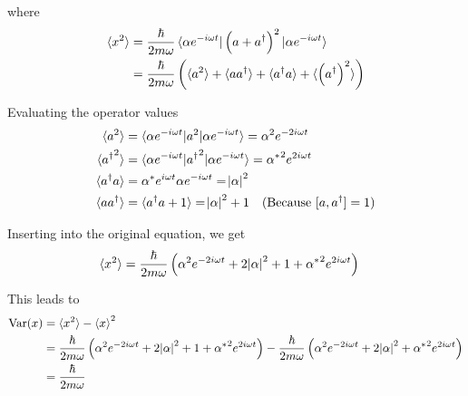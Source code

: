 \documentclass[a4paper,german,12pt,smallheadings]{scrartcl}
\begin{document}
\begin{enumerate}[a)]
    where
    \begin{align*}
      \braket{x^2} &= \frac{\hbar}{2 m \omega} \braket{\alpha e^{-i \omega t}|\del{a + a^\dagger}^2|\alpha e^{-i \omega t}} \\
                   &= \frac{\hbar}{2 m \omega} \del{\braket{a^2} + \braket{aa^\dagger} + \braket{a^\dagger a} + \braket{\del{a^\dagger}^2}}
    \end{align*}

    Evaluating the operator values
    \begin{align*}
      \braket{a^2} &= \braket{\alpha e^{-i \omega t}|a^2|\alpha e^{-i \omega t}} = \alpha^2 e^{-2i \omega t} \\
      \braket{{a^\dagger}^2} &= \braket{\alpha e^{-i \omega t}|{a^\dagger}^2|\alpha e^{-i \omega t}} = {\alpha^*}^2 e^{2i \omega t} \\
      \braket{a^\dagger a} &= \alpha^* e^{i \omega t} \alpha e^{-i \omega t} = \envert{\alpha}^2 \\
      \braket{aa^\dagger} &= \braket{a^\dagger a + 1} = \envert{\alpha}^2 + 1
      \quad \text{(Because $[a, a^\dagger] = 1$)} \\
    \end{align*}

    Inserting into the original equation, we get
    \begin{align*}
      \braket{x^2} &= \frac{\hbar}{2 m \omega} \del{\alpha^2 e^{-2i \omega t} + 2\envert{\alpha}^2 + 1 + {\alpha^*}^2 e^{2 i \omega t}}
    \end{align*}

    This leads to
    \begin{align*}
      \operatorname{Var}(x) &= \braket{x^2} - \braket{x}^2 \\
                            &= \frac{\hbar}{2 m \omega} \del{\alpha^2 e^{-2i \omega t} + 2\envert{\alpha}^2 + 1 + {\alpha^*}^2 e^{2 i \omega t}} -
                               \frac{\hbar}{2 m \omega} \del{\alpha^2 e^{-2i \omega t} + 2\envert{\alpha}^2 + {\alpha^*}^2 e^{2 i \omega t}} \\
                            &= \frac{\hbar}{2 m \omega}
    \end{align*}

\end{enumerate}
\end{document}
